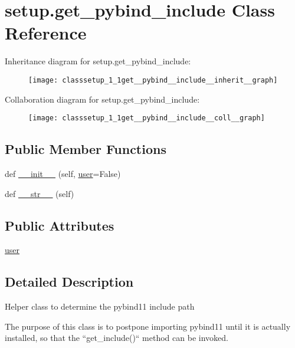 \hypertarget{classsetup_1_1get__pybind__include}{}\section{setup.\+get\+\_\+pybind\+\_\+include Class Reference}
\label{classsetup_1_1get__pybind__include}


Inheritance diagram for setup.\+get\+\_\+pybind\+\_\+include\+:
\nopagebreak
\begin{figure}[H]
\begin{center}
\leavevmode
\texttt{[image: classsetup\_1\_1get\_\_pybind\_\_include\_\_inherit\_\_graph]}
\end{center}
\end{figure}


Collaboration diagram for setup.\+get\+\_\+pybind\+\_\+include\+:
\nopagebreak
\begin{figure}[H]
\begin{center}
\leavevmode
\texttt{[image: classsetup\_1\_1get\_\_pybind\_\_include\_\_coll\_\_graph]}
\end{center}
\end{figure}
\subsection*{Public Member Functions}
\begin{DoxyCompactItemize}
\item 
def \hyperlink{classsetup_1_1get__pybind__include_a4606005b4f32141d3f2c1369b69593e3}{\+\_\+\+\_\+init\+\_\+\+\_\+} (self, \hyperlink{classsetup_1_1get__pybind__include_a16fb9df4f97b93342f0cf789bb449529}{user}=False)
\item 
def \hyperlink{classsetup_1_1get__pybind__include_a18325cf8f6566c923226d9a145ba666d}{\+\_\+\+\_\+str\+\_\+\+\_\+} (self)
\end{DoxyCompactItemize}
\subsection*{Public Attributes}
\begin{DoxyCompactItemize}
\item 
\hyperlink{classsetup_1_1get__pybind__include_a16fb9df4f97b93342f0cf789bb449529}{user}
\end{DoxyCompactItemize}


\subsection{Detailed Description}
\begin{DoxyVerb}Helper class to determine the pybind11 include path

The purpose of this class is to postpone importing pybind11
until it is actually installed, so that the ``get_include()``
method can be invoked. \end{DoxyVerb}
 

